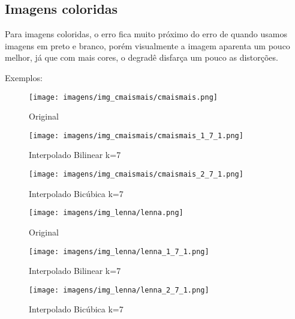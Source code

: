 \documentclass[12pt]{article}
\begin{document}
\subsection{Imagens coloridas}
Para imagens coloridas, o erro fica muito próximo do erro de quando usamos imagens em preto e branco, porém visualmente a imagem aparenta um pouco melhor, já que com mais cores, o degradê disfarça um pouco as distorções.

Exemplos:
\begin{figure}[H]
  \centering
  \begin{minipage}{.5\textwidth}
    \centering
    \texttt{[image: imagens/img\_cmaismais/cmaismais.png]}
    \caption{Original}
  \end{minipage}
  \begin{minipage}{.5\linewidth}
  \end{minipage}
  \begin{minipage}{.5\textwidth}
    \centering
    \texttt{[image: imagens/img\_cmaismais/cmaismais\_1\_7\_1.png]}
    \caption{Interpolado Bilinear k=7}
  \end{minipage}%
  \begin{minipage}{.5\textwidth}
    \centering
    \texttt{[image: imagens/img\_cmaismais/cmaismais\_2\_7\_1.png]}
    \caption{Interpolado Bicúbica k=7}
  \end{minipage}
\end{figure}

\begin{figure}[H]
  \centering
  \begin{minipage}{.5\textwidth}
    \centering
    \texttt{[image: imagens/img\_lenna/lenna.png]}
    \caption{Original}
  \end{minipage}
  \begin{minipage}{.5\linewidth}
  \end{minipage}
  \begin{minipage}{.5\textwidth}
    \centering
    \texttt{[image: imagens/img\_lenna/lenna\_1\_7\_1.png]}
    \caption{Interpolado Bilinear k=7}
  \end{minipage}%
  \begin{minipage}{.5\textwidth}
    \centering
    \texttt{[image: imagens/img\_lenna/lenna\_2\_7\_1.png]}
    \caption{Interpolado Bicúbica k=7}
  \end{minipage}
\end{figure}

\newpage
\end{document}

